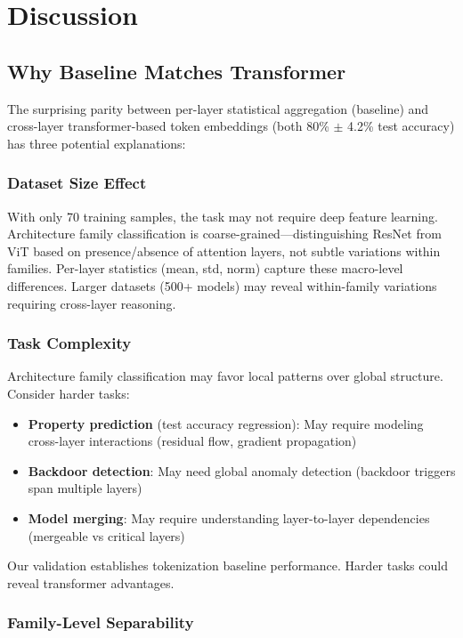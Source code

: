 \section{Discussion}

\subsection{Why Baseline Matches Transformer}

The surprising parity between per-layer statistical aggregation (baseline) and cross-layer transformer-based token embeddings (both 80\% $\pm$ 4.2\% test accuracy) has three potential explanations:

\subsubsection{Dataset Size Effect}

With only 70 training samples, the task may not require deep feature learning. Architecture family classification is coarse-grained---distinguishing ResNet from ViT based on presence/absence of attention layers, not subtle variations within families. Per-layer statistics (mean, std, norm) capture these macro-level differences. Larger datasets (500+ models) may reveal within-family variations requiring cross-layer reasoning.

\subsubsection{Task Complexity}

Architecture family classification may favor local patterns over global structure. Consider harder tasks:

\begin{itemize}
\item \textbf{Property prediction} (test accuracy regression): May require modeling cross-layer interactions (residual flow, gradient propagation)
\item \textbf{Backdoor detection}: May need global anomaly detection (backdoor triggers span multiple layers)
\item \textbf{Model merging}: May require understanding layer-to-layer dependencies (mergeable vs critical layers)
\end{itemize}

Our validation establishes tokenization baseline performance. Harder tasks could reveal transformer advantages.

\subsubsection{Family-Level Separability}

